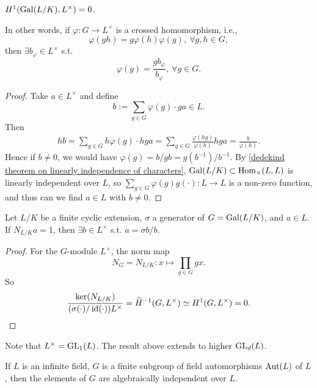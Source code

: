 \begin{proposition}\label{Hilbert 90 - multiplicative - cohomology}
    $H^1(\operatorname{Gal}(L/K), L^\times) = 0$.\par
    In other words, if $\varphi : G\to L^\times$ is a crossed homomorphism, i.e., \[\varphi(gh) = g\varphi(h)\varphi(g),\ \forall g, h\in G,\]
    then $\exists b_\varphi\in L^\times$ s.t. \[\varphi(g) = \frac{g b_\varphi}{b_\varphi},\ \forall g\in G.\]
\end{proposition}
\begin{proof}
    Take $a\in L^\times$ and define \[b := \sum_{g\in G}\varphi(g)\cdot ga\in L.\]
    Then \begin{align*}
        hb = \sum_{g\in G} h\varphi(g)\cdot hga
        = \sum_{g\in G}\frac{\varphi(hg)}{\varphi(h)} hga = \frac{b}{\varphi(h)}.
    \end{align*}
    Hence if $b\ne 0$, we would have $\varphi(g) = b/gb = g(b^{-1})/b^{-1}$.
    By \cref{dedekind theorem on linearly independence of characters},
    $\operatorname{Gal}(L/K)\subset \operatorname{Hom}_\times(L, L)$ is linearly independent over $L$,
    so $\sum_{g\in G}\varphi(g)g(\cdot) : L\to L$ is a non-zero function, and thus can we find $a\in L$ with $b\ne 0$.
\end{proof}

\begin{corollary}
    Let $L/K$ be a finite cyclic extension, $\sigma$ a generator of $G = \operatorname{Gal}(L/K)$, and $a\in L$.
    If $N_{L/K}a = 1$, then $\exists b\in L^\times$ s.t. $a = \sigma b/b$.
\end{corollary}
\begin{proof}
    For the $G$-module $L^\times$, the norm map \[N_G = N_{L/K} : x\mapsto\prod_{g\in G}  gx.\]
    So \[\dfrac{\ker(N_{L/K})}{(\sigma(\cdot) / \operatorname{id}(\cdot))L^\times} = \widehat H^{-1}(G, L^\times) \simeq H^1(G, L^\times) = 0.\qedhere\]
\end{proof}

Note that $L^\times = \operatorname{GL}_1(L)$.
The result above extends to higher $\operatorname{GL}_d(L)$.
\begin{theorem}[Artin]\label{artin theorem on algebraically independence of characters}
    If $L$ is an infinite field,
    $G$ is a finite subgroup of field automorphisms $\operatorname{Aut}(L)$ of $L$,
    then the elements of $G$ are algebraically independent over $L$.
\end{theorem}

